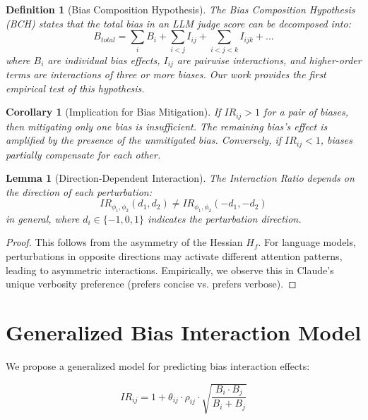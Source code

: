 \documentclass[11pt]{article}
\newtheorem{definition}{Definition}
\newtheorem{lemma}{Lemma}
\newtheorem{corollary}{Corollary}
\newtheorem{proof}{Proof}
\begin{document}
\begin{definition}[Bias Composition Hypothesis]
The Bias Composition Hypothesis (BCH) states that the total bias in an LLM judge score can be decomposed into:
\begin{equation}
B_{total} = \sum_i B_i + \sum_{i<j} I_{ij} + \sum_{i<j<k} I_{ijk} + ...
\end{equation}
where $B_i$ are individual bias effects, $I_{ij}$ are pairwise interactions, and higher-order terms are interactions of three or more biases. Our work provides the first empirical test of this hypothesis.
\end{definition}

\begin{corollary}[Implication for Bias Mitigation]
If $IR_{ij} > 1$ for a pair of biases, then mitigating only one bias is insufficient. The remaining bias's effect is amplified by the presence of the unmitigated bias. Conversely, if $IR_{ij} < 1$, biases partially compensate for each other.
\end{corollary}

\begin{lemma}[Direction-Dependent Interaction]
The Interaction Ratio depends on the direction of each perturbation:
\begin{equation}
IR_{\phi_1,\phi_2}(d_1, d_2) \neq IR_{\phi_1,\phi_2}(-d_1, -d_2)
\end{equation}
in general, where $d_i \in \{-1, 0, 1\}$ indicates the perturbation direction.
\end{lemma}

\begin{proof}
This follows from the asymmetry of the Hessian $H_f$. For language models, perturbations in opposite directions may activate different attention patterns, leading to asymmetric interactions. Empirically, we observe this in Claude's unique verbosity preference (prefers concise vs. prefers verbose).
\end{proof}

\section{Generalized Bias Interaction Model}

We propose a generalized model for predicting bias interaction effects:

\begin{equation}
IR_{ij} = 1 + \theta_{ij} \cdot \rho_{ij} \cdot \sqrt{\frac{B_i \cdot B_j}{B_i + B_j}}
\end{equation}
\end{document}
